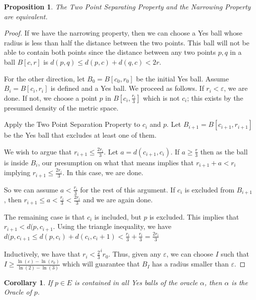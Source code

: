 \documentclass[12pt]{article}
\newtheorem{corollary}{Corollary}[section]
\newtheorem{proposition}{Proposition}[section]
\begin{document}
\begin{proposition}
    The Two Point Separating Property and the Narrowing Property are equivalent.
\end{proposition}

\begin{proof}

If we have the narrowing property, then we can choose a Yes ball whose radius is less than half the distance between the two points. This ball will not be able to contain both points since the distance between any two points $p, q$ in a ball $B[c, r]$ is $d(p,q) \leq d(p, c) + d(q,c) < 2r$.

For the other direction, let $B_0 = B[c_0, r_0]$ be the initial Yes ball. Assume $B_i = B[c_i, r_i]$ is defined and a Yes ball. We proceed as follows. If $r_i < \varepsilon$, we are done. If not, we choose a point $p$ in $B[c_i, \frac{r_i}{3}]$ which is not $c_i$; this exists by the presumed density of the metric space. 

Apply the Two Point Separation Property to $c_i$ and $p$. Let $B_{i+1} = B[c_{i+1}, r_{i+1}]$  be the Yes ball that excludes at least one of them.

We wish to argue that $r_{i +1} \leq \frac{2r_i}{3}$. Let $a = d(c_{i+1}, c_i)$. If $a \geq \frac{r}{3}$ then as the ball is
inside $B_i$, our presumption on what that means implies that $r_{i+1} + a < r_i$ implying $ r_{i+1} \leq \frac{2 r_i}{3}$. In this
case, we are done. 

So we can assume $a < \frac{r_i}{3}$ for the rest of this argument. If $c_i$ is excluded from $B_{i+1}$, then $r_{i+1} \leq a < \frac{r_i}{3} < \frac{2 r_i}{3}$ and we are again done.

The remaining case is that $c_i$ is included, but $p$ is excluded. This implies that $r_{i+1} < d(p, c_{i+1}$. Using the triangle inequality, we have $d(p, c_{i+1} \leq d(p, c_i) + d(c_i, c_i+1) < \frac{r_i}{3} + \frac{r_i}{3} = \frac{2r_i}{3}$ 

Inductively, we have that $r_i < \frac{2}{3}^i r_0$. Thus, given any $\varepsilon$, we can choose $I$ such that $I \geq \frac{\ln(\varepsilon) - \ln(r_0)}{\ln(2) - \ln(3)}$ which will guarantee that $B_I$ has a radius smaller than $\varepsilon$.
\end{proof}

\begin{corollary}
If $p \in E$ is contained in all Yes balls of the oracle $\alpha$, then $\alpha$ is the Oracle of $p$. 
\end{corollary}
\end{document}
